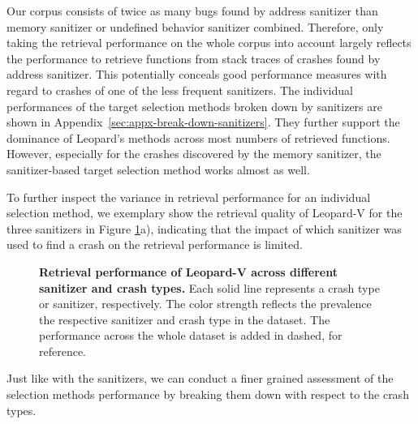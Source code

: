 Our corpus consists of twice as many bugs found by address sanitizer than memory sanitizer or undefined behavior sanitizer combined. Therefore, only taking the retrieval performance on the whole corpus into account largely reflects the performance to retrieve functions from stack traces of crashes found by address sanitizer. This potentially conceals good performance measures with regard to crashes of one of the less frequent sanitizers.
%
\cstart
The individual performances of the target selection methods broken down by sanitizers are shown in Appendix~\ref{sec:appx-break-down-sanitizers}. They further support the dominance of Leopard's methods across most numbers of retrieved functions. However, especially for the crashes discovered by the memory sanitizer, the sanitizer-based target selection method works almost as well.
\cend

To further inspect the variance in retrieval performance for an individual selection method, we exemplary show 
the retrieval quality of Leopard-V for the three sanitizers in Figure \ref{fig:mean-gains-leopard}a), indicating
that the impact of which sanitizer was used to find a crash on the retrieval performance is limited.  

\begin{figure}
	\begin{center}
		
	\end{center}
	\caption{\textbf{Retrieval performance of Leopard-V across different sanitizer and crash types.} \normalfont Each solid line represents a crash type or sanitizer, respectively. The color strength reflects the prevalence the respective sanitizer and crash type in the dataset. The performance across the whole dataset is added in dashed, for reference.}
	\label{fig:mean-gains-leopard}
\end{figure}

Just like with the sanitizers, we can conduct a finer grained assessment of the selection methods performance by breaking them down with respect to the crash types. 


